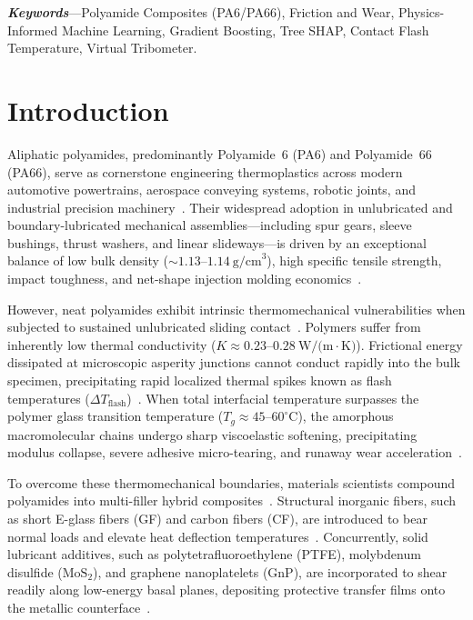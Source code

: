 \documentclass[10pt,twocolumn,a4paper]{article}
\begin{document}
\textbf{\textit{Keywords}}---Polyamide Composites (PA6/PA66), Friction and Wear, Physics-Informed Machine Learning, Gradient Boosting, Tree SHAP, Contact Flash Temperature, Virtual Tribometer.

\section{Introduction}
\label{sec:intro}
Aliphatic polyamides, predominantly Polyamide~6 (PA6) and Polyamide~66 (PA66), serve as cornerstone engineering thermoplastics across modern automotive powertrains, aerospace conveying systems, robotic joints, and industrial precision machinery~\cite{friedrich2018tribology,zaghloul2024abrasive}. Their widespread adoption in unlubricated and boundary-lubricated mechanical assemblies---including spur gears, sleeve bushings, thrust washers, and linear slideways---is driven by an exceptional balance of low bulk density ($\sim 1.13$--$1.14~\text{g/cm}^3$), high specific tensile strength, impact toughness, and net-shape injection molding economics~\cite{bolat2024cfpa6,li2024gear}.

However, neat polyamides exhibit intrinsic thermomechanical vulnerabilities when subjected to sustained unlubricated sliding contact~\cite{bowden1950friction}. Polymers suffer from inherently low thermal conductivity ($K \approx 0.23$--$0.28~\text{W/(m}\cdot\text{K)}$). Frictional energy dissipated at microscopic asperity junctions cannot conduct rapidly into the bulk specimen, precipitating rapid localized thermal spikes known as flash temperatures ($\Delta T_{\text{flash}}$)~\cite{archard1953contact,ashby1991wearmaps}. When total interfacial temperature surpasses the polymer glass transition temperature ($T_g \approx 45$--$60^\circ\text{C}$), the amorphous macromolecular chains undergo sharp viscoelastic softening, precipitating modulus collapse, severe adhesive micro-tearing, and runaway wear acceleration~\cite{wang2025hightemp}.

To overcome these thermomechanical boundaries, materials scientists compound polyamides into multi-filler hybrid composites~\cite{kumar2024mos2,kumar2024gnpmos2}. Structural inorganic fibers, such as short E-glass fibers (GF) and carbon fibers (CF), are introduced to bear normal loads and elevate heat deflection temperatures~\cite{zaghloul2024abrasive,bolat2024cfpa6}. Concurrently, solid lubricant additives, such as polytetrafluoroethylene (PTFE), molybdenum disulfide ($\text{MoS}_2$), and graphene nanoplatelets (GnP), are incorporated to shear readily along low-energy basal planes, depositing protective transfer films onto the metallic counterface~\cite{martinez2024pa6ptfe,ventsel2025cryogenic}.
\end{document}
